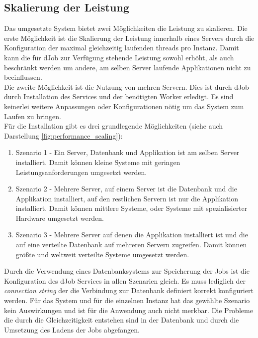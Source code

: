 \subsection{Skalierung der Leistung} \label{sec:scaling}
Das umgesetzte System bietet zwei Möglichkeiten die Leistung zu skalieren. Die erste Möglichkeit ist die Skalierung der Leistung innerhalb eines Servers durch die Konfiguration der maximal gleichzeitig laufenden threads pro Instanz. Damit kann die für dJob zur Verfügung stehende Leistung sowohl erhöht, als auch beschränkt werden um andere, am selben Server laufende Applikationen nicht zu beeinflussen.
\\Die zweite Möglichkeit ist die Nutzung von mehren Servern. Dies ist durch dJob durch Installation des Services und der benötigten Worker erledigt. Es sind keinerlei weitere Anpassungen oder Konfigurationen nötig um das System zum Laufen zu bringen. 
\\Für die Installation gibt es drei grundlegende Möglichkeiten (siehe auch Darstellung \ref{fig:performance_scaling}):
\begin{enumerate}
	\item Szenario 1 - Ein Server, Datenbank und Applikation ist am selben Server installiert. Damit können kleine Systeme mit geringen Leistungsanforderungen umgesetzt werden.
	\item Szenario 2 - Mehrere Server, auf einem Server ist die Datenbank und die Applikation installiert, auf den restlichen Servern ist nur die Applikation installiert. Damit können mittlere Systeme, oder Systeme mit spezialisierter Hardware umgesetzt werden.
	\item Szenario 3 - Mehrere Server auf denen die Applikation installiert ist und die auf eine verteilte Datenbank auf mehreren Servern zugreifen. Damit können größte und weltweit verteilte Systeme umgesetzt werden.
\end{enumerate}
Durch die Verwendung eines Datenbanksystems zur Speicherung der Jobs ist die Konfiguration des dJob Services in allen Szenarien gleich. Es muss lediglich der \emph{connection string} der die Verbindung zur Datenbank definiert korrekt konfiguriert werden. Für das System und für die einzelnen Instanz hat das gewählte Szenario kein Auswirkungen und ist für die Anwendung auch nicht merkbar. Die Probleme die durch die Gleichzeitigkeit entstehen sind in der Datenbank und durch die Umsetzung des Ladens der Jobs abgefangen. 
